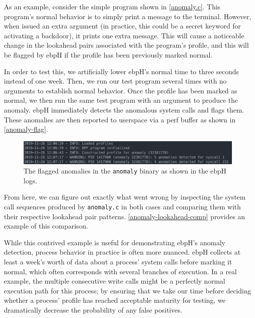 \documentclass[
  12pt]{findlay}
\newcommand{\passthrough}[1]{#1}
\begin{document}
As an example, consider the simple program shown in \autoref{anomaly.c}.
This program's normal behavior is to simply print a message to the
terminal. However, when issued an extra argument (in practice, this
could be a secret keyword for activating a backdoor), it prints one
extra message. This will cause a noticeable change in the lookahead
pairs associated with the program's profile, and this will be flagged by
ebpH if the profile has been previously marked normal.

\protect\enlargethispage*{\baselineskip}


In order to test this, we artificially lower ebpH's normal time to three
seconds instead of one week. Then, we run our test program several times
with no arguments to establish normal behavior. Once the profile has
been marked as normal, we then run the same test program with an
argument to produce the anomaly. ebpH immediately detects the anomalous
system calls and flags them. These anomalies are then reported to
userspace via a perf buffer as shown in \autoref{anomaly-flag}.

\begin{figure}
\centering
\includegraphics{../figures/anomaly.png}
\caption{\label{anomaly-flag}The flagged anomalies in the
\passthrough{\lstinline!anomaly!} binary as shown in the ebpH logs.}
\end{figure}

From here, we can figure out exactly what went wrong by inspecting the
system call sequences produced by \passthrough{\lstinline!anomaly.c!} in
both cases and comparing them with their respective lookahead pair
patterns. \autoref{anomaly-lookahead-comp} provides an example of this
comparison.

While this contrived example is useful for demonstrating ebpH's anomaly
detection, process behavior in practice is often more nuanced. ebpH
collects at least a week's worth of data about a process' system calls
before marking it normal, which often corresponds with several branches
of execution. In a real example, the multiple consecutive write calls
might be a perfectly normal execution path for this process; by ensuring
that we take our time before deciding whether a process' profile has
reached acceptable maturity for testing, we dramatically decrease the
probability of any false positives.
\end{document}
